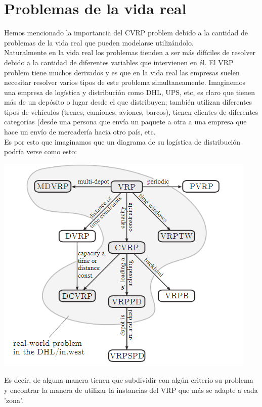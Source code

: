 \documentclass[11pt,a4paper]{article}
\begin{document}
\section{Problemas de la vida real}
Hemos mencionado la importancia del CVRP problem debido a la cantidad de problemas de la vida real que pueden modelarse utilizándolo.\\
Naturalmente en la vida real los problemas tienden a ser más difíciles de resolver debido a la cantidad de diferentes variables que intervienen en él. El VRP problem tiene muchos derivados y es que en la vida real las empresas suelen necesitar resolver varios tipos de este problema simultaneamente. Imaginemos una empresa de logística y distribución como DHL, UPS, etc, es claro que tienen más de un depósito o lugar desde el que distribuyen; también utilizan diferentes tipos de vehículos (trenes, camiones, aviones, barcos), tienen clientes de diferentes categorías (desde una persona que envía un paquete a otra a una empresa que hace un envío de mercadería hacia otro país, etc. \\ Es por esto que imaginamos que un diagrama de su logística de distribución podría verse como esto:

\begin{center}
\includegraphics[scale=.8]{graficos/img1.png}
\end{center}

Es decir, de alguna manera tienen que subdividir con algún criterio su problema y encontrar la manera de utilizar la instancias del VRP que más se adapte a cada 'zona'.\\
\end{document}
